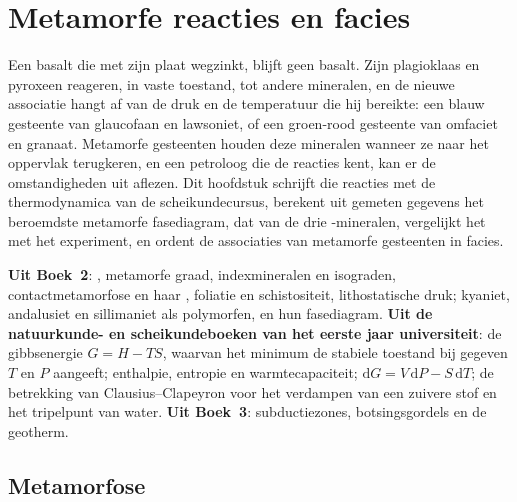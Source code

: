 \chapter{Metamorfe reacties en facies}\label{ch:b2:metamorphic-facies}

Een basalt die met zijn plaat wegzinkt, blijft geen basalt. Zijn plagioklaas en pyroxeen
reageren, in vaste toestand, tot andere mineralen, en de nieuwe associatie hangt af van de
druk en de temperatuur die hij bereikte: een blauw gesteente van glaucofaan en lawsoniet, of een
groen-rood gesteente van omfaciet en granaat. Metamorfe gesteenten houden deze mineralen wanneer
ze naar het oppervlak terugkeren, en een petroloog die de reacties kent, kan er de
omstandigheden uit aflezen. Dit hoofdstuk schrijft die reacties met de thermodynamica van de
scheikundecursus, berekent uit gemeten gegevens het beroemdste metamorfe fasediagram,
dat van de drie -mineralen, vergelijkt het met het experiment, en ordent de
associaties van metamorfe gesteenten in facies.

\begin{recall}
\textbf{Uit Boek~2}: , metamorfe graad, indexmineralen
en isograden, contactmetamorfose en haar , foliatie en schistositeit,
lithostatische druk; kyaniet, andalusiet en sillimaniet als polymorfen, en hun
fasediagram. \textbf{Uit de natuurkunde- en scheikundeboeken van het eerste jaar universiteit}: de
gibbsenergie $G = H - TS$, waarvan het minimum de stabiele toestand bij gegeven $T$ en $P$ aangeeft;
enthalpie, entropie en warmtecapaciteit; $\mathrm dG = V\,\mathrm dP - S\,\mathrm dT$; de
betrekking van Clausius--Clapeyron voor het verdampen van een zuivere stof en het
tripelpunt van water. \textbf{Uit Boek~3}: subductiezones, botsingsgordels en
de geotherm.
\end{recall}

\section{Metamorfose}\label{sec:b2:metamorphic-facies:metamorphism}

